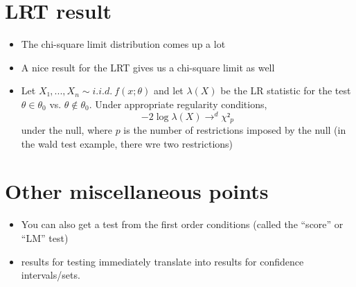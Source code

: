 \section{LRT result}

\begin{itemize}
\item The chi-square limit distribution comes up a lot
\item A nice result for the LRT gives us a chi-square limit as well
\item Let $X₁,...,X_n ∼ i.i.d.\ f(x; θ)$ and let $λ(X)$ be the LR
  statistic for the test $θ ∈ θ_0$ vs. $θ ∉ θ_0$.  Under appropriate
  regularity conditions,
  \[-2 \log λ(X) →^d χ²_p\]
      under the null, where $p$ is the number of restrictions imposed
      by the null (in the wald test example, there wre two
      restrictions)
\end{itemize}

\section{Other miscellaneous points}

\begin{itemize}
\item You can also get a test from the first order conditions (called
      the ``score'' or ``LM'' test)
\item results for testing immediately translate into results for
      confidence intervals/sets.
\end{itemize}

